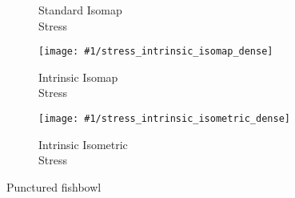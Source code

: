 {\begin{figure}[h]
\begin{centering}
\begin{subfigure}[b]{0.32\linewidth}
			\captionsetup{justification=centering}
			\caption{Standard Isomap \\Stress}
		\end{subfigure}
		\hfill
		\begin{subfigure}[b]{0.32\linewidth}
			\texttt{[image: \#1/stress\_intrinsic\_isomap\_dense]}
			\captionsetup{justification=centering}
			\caption{Intrinsic Isomap \\Stress}
		\end{subfigure}
		\hfill
		\begin{subfigure}[b]{0.32\linewidth}
			\texttt{[image: \#1/stress\_intrinsic\_isometric\_dense]}
			\captionsetup{justification=centering}
			\caption{Intrinsic Isometric \\Stress}
		\end{subfigure}
	\end{centering}
	\caption{Punctured fishbowl}
\end{figure}
}




